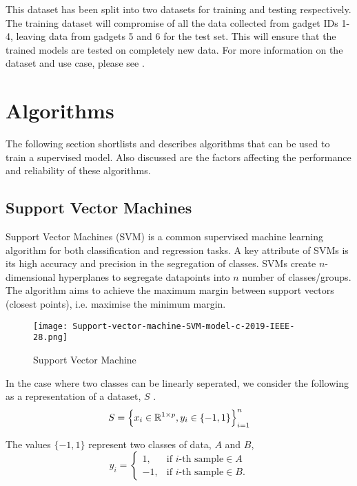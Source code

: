 
This dataset has been split into two datasets for training and testing respectively.
The training dataset will compromise of all the data collected from gadget IDs 1-4, leaving data from gadgets 5 and 6 for the test set.
This will ensure that the trained models are tested on completely new data. For more information on the dataset and use case, please see \cite{ahonen}.

\section{Algorithms}
The following section shortlists and describes algorithms that can be used to train a supervised model. 
Also discussed are the factors affecting the performance and reliability of these algorithms.

\subsection{Support Vector Machines}
Support Vector Machines (SVM) is a common supervised machine learning algorithm for both classification and regression tasks.
A key attribute of SVMs is its high accuracy and precision in the segregation of classes.
SVMs create $n$-dimensional hyperplanes to segregate datapoints into $n$ number of classes/groups. 
The algorithm aims to achieve the maximum margin between support vectors (closest points), i.e. maximise the minimum margin.

\begin{figure}[h]
    \texttt{[image: Support-vector-machine-SVM-model-c-2019-IEEE-28.png]}
    \centering
    \caption{Support Vector Machine \cite{svm-pic}}
    \label{fig:SVM}
\end{figure}

In the case where two classes can be linearly seperated, we consider the following as a representation of a dataset, $S$ \cite{6653952} \cite{d163fd27cc414d1a806b3e2db0164bfc}.
\begin{equation}
    S = \Big\{x_i \in \mathbb{R}^{1 \times p}, y_i \in \{-1, 1\}\Big\}^n_{i=1}
\end{equation}

The values $\{-1, 1\}$ represent two classes of data, $A$ and $B$,
\begin{equation}
    y_i = \begin{cases}
        1, & \text{if $i$} \text{-th sample} \in  A\\
        -1, & \text{if $i$} \text{-th sample} \in  B.
    \end{cases}
\end{equation}

